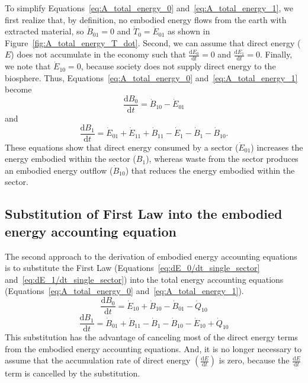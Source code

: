 To simplify Equations~\ref{eq:A_total_energy_0} 
and~\ref{eq:A_total_energy_1},
we first realize that, by definition, no embodied energy flows from 
the earth with extracted material, so $\dot{B}_{01} = 0$
and $\dot{T}_{0} = \dot{E}_{01}$ as shown in Figure~\ref{fig:A_total_energy_T_dot}.
Second, we can assume that direct energy ($E$) does not accumulate
in the economy such that 
$\frac{\mathrm{d}E_0}{\mathrm{d}t} = 0$ and
$\frac{\mathrm{d}E_1}{\mathrm{d}t} = 0$.
Finally, we note that $\dot{E}_{10} = 0$, 
because society does not supply direct energy 
to the biosphere. Thus, Equations~\ref{eq:A_total_energy_0}
and~\ref{eq:A_total_energy_1} become
%
\begin{equation} \label{eq:A_total_energy_0_simp}
	\frac{\mathrm{d}B_{0}}{\mathrm{d}t} 
	= \dot{B}_{10} 
	- \dot{E}_{01}
\end{equation}
%
and
%
\begin{equation} \label{eq:A_total_energy_1_simp}
	\frac{\mathrm{d}B_{1}}{\mathrm{d}t} 
	= \dot{E}_{01} 
	+ \dot{E}_{11}
	+ \dot{B}_{11}
	- \dot{E}_{1}
	- \dot{B}_{1}
	- \dot{B}_{10}.	
\end{equation}
%
These equations show that direct energy consumed by a 
sector ($\dot{E}_{01}$) increases the energy embodied within the sector ($B_1$), 
whereas waste from the sector produces an embodied
energy outflow ($\dot{B}_{10}$) that reduces 
the energy embodied within the sector. 


\subsection{Substitution of First Law
into the embodied energy accounting equation} %
\label{subsec:A_first_law_embodied}

The second approach to the derivation of embodied energy
accounting equations is to substitute the First Law
(Equations~\ref{eq:dE_0/dt_single_sector} and~\ref{eq:dE_1/dt_single_sector}) 
into the total energy accounting equations 
(Equations~\ref{eq:A_total_energy_0} and~\ref{eq:A_total_energy_1}). 
%
\begin{equation} \label{eq:A_dB0/dt}
	\frac{\mathrm{d}B_{0}}{\mathrm{d}t} 
	= \dot{E}_{10}
	+ \dot{B}_{10} 
	- \dot{B}_{01}
	- \dot{Q}_{10}
\end{equation}
%
\begin{equation} \label{eq:A_dB1/dt}
	\frac{\mathrm{d}B_{1}}{\mathrm{d}t} 
	= \dot{B}_{01} 
	+ \dot{B}_{11}
	- \dot{B}_{1}
	- \dot{B}_{10}
	- \dot{E}_{10}
	+ \dot{Q}_{10}
\end{equation}
%
This substitution has the advantage of canceling most 
of the direct energy terms from the embodied energy accounting equations.
And, it is no longer necessary to assume that the 
accumulation rate of direct energy
$\left( \frac{\mathrm{d}E}{\mathrm{d}t} \right)$
is zero, because the 
$\frac{\mathrm{d}E}{\mathrm{d}t}$
term is cancelled by the substitution.

